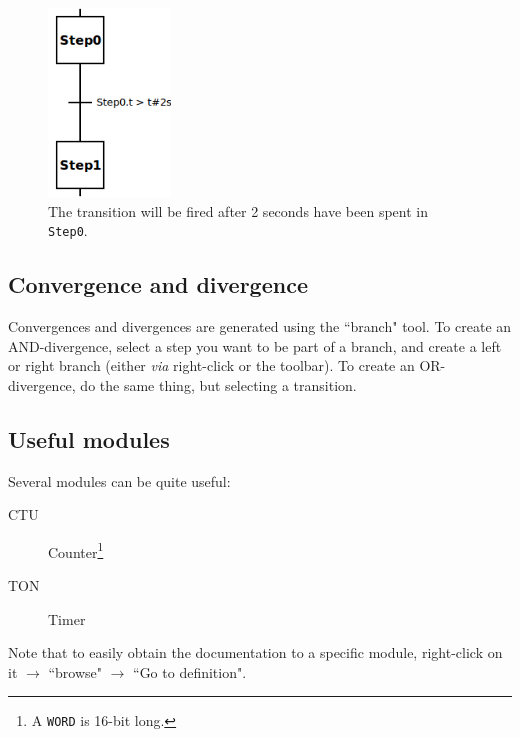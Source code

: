 \documentclass[10pt,a4paper]{article}
\begin{document}
\begin{figure}
  \begin{center}
    \includegraphics[height=5cm]{transition-timer.png}
  \end{center}
  \caption{The transition will be fired after 2 seconds have been spent in \texttt{Step0}.}
  \label{fig:transition-timer}
\end{figure}

\subsection{Convergence and divergence}
Convergences and divergences are generated using the ``branch" tool.
To create an AND-divergence, select a step you want to be part of a branch, and create a left or right branch (either \textit{via} right-click or the toolbar).
To create an OR-divergence, do the same thing, but selecting a transition.

\subsection{Useful modules}
Several modules can be quite useful:
\begin{description}
  \item[CTU] Counter\footnote{A \texttt{WORD} is 16-bit long.}
  \item[TON] Timer
\end{description}

Note that to easily obtain the documentation to a specific module, right-click on it $\rightarrow$ ``browse" $\rightarrow$ ``Go to definition".




\end{document}
